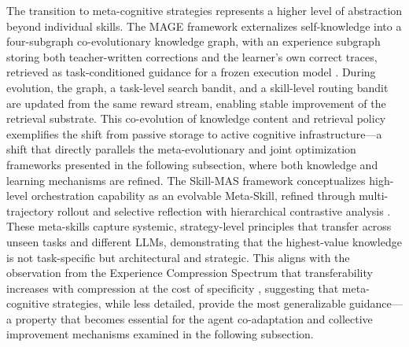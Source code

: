 \documentclass[11pt]{article}
\begin{document}
The transition to meta-cognitive strategies represents a higher level of abstraction beyond individual skills. The MAGE framework externalizes self-knowledge into a four-subgraph co-evolutionary knowledge graph, with an experience subgraph storing both teacher-written corrections and the learner's own correct traces, retrieved as task-conditioned guidance for a frozen execution model \cite{ref142}. During evolution, the graph, a task-level search bandit, and a skill-level routing bandit are updated from the same reward stream, enabling stable improvement of the retrieval substrate. This co-evolution of knowledge content and retrieval policy exemplifies the shift from passive storage to active cognitive infrastructure---a shift that directly parallels the meta-evolutionary and joint optimization frameworks presented in the following subsection, where both knowledge and learning mechanisms are refined. The Skill-MAS framework conceptualizes high-level orchestration capability as an evolvable Meta-Skill, refined through multi-trajectory rollout and selective reflection with hierarchical contrastive analysis \cite{ref143}. These meta-skills capture systemic, strategy-level principles that transfer across unseen tasks and different LLMs, demonstrating that the highest-value knowledge is not task-specific but architectural and strategic. This aligns with the observation from the Experience Compression Spectrum that transferability increases with compression at the cost of specificity \cite{ref133}, suggesting that meta-cognitive strategies, while less detailed, provide the most generalizable guidance---a property that becomes essential for the agent co-adaptation and collective improvement mechanisms examined in the following subsection.
\end{document}
